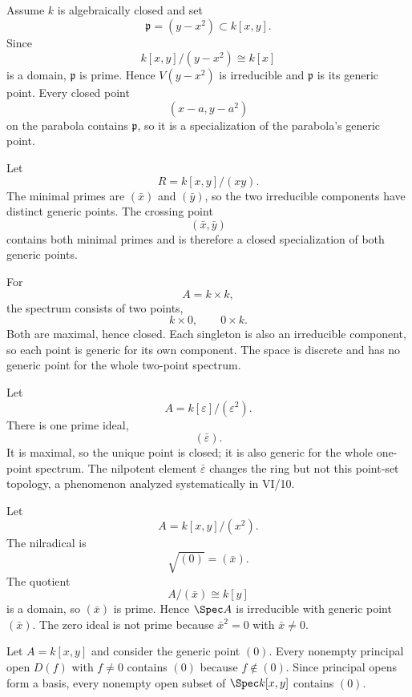 \begin{example}
Assume $k$ is algebraically closed and set
\[
\mathfrak p=(y-x^2)\subset k[x,y].
\]
Since
\[
k[x,y]/(y-x^2)\cong k[x]
\]
is a domain, $\mathfrak p$ is prime.  Hence $V(y-x^2)$ is irreducible and
$\mathfrak p$ is its generic point.  Every closed point
\[
(x-a,y-a^2)
\]
on the parabola contains $\mathfrak p$, so it is a specialization of the parabola's
generic point.
\end{example}

\begin{example}
Let
\[
R=k[x,y]/(xy).
\]
The minimal primes are $(\bar x)$ and $(\bar y)$, so the two irreducible components have
distinct generic points.  The crossing point
\[
(\bar x,\bar y)
\]
contains both minimal primes and is therefore a closed specialization of both generic
points.
\end{example}

\begin{example}
For
\[
A=k\times k,
\]
the spectrum consists of two points,
\[
k\times0,\qquad 0\times k.
\]
Both are maximal, hence closed.  Each singleton is also an irreducible component, so each
point is generic for its own component.  The space is discrete and has no generic point
for the whole two-point spectrum.
\end{example}

\begin{example}
Let
\[
A=k[\varepsilon]/(\varepsilon^2).
\]
There is one prime ideal,
\[
(\bar\varepsilon).
\]
It is maximal, so the unique point is closed; it is also generic for the whole one-point
spectrum.  The nilpotent element $\bar\varepsilon$ changes the ring but not this point-set
topology, a phenomenon analyzed systematically in VI/10.
\end{example}

\begin{example}
Let
\[
A=k[x,y]/(x^2).
\]
The nilradical is
\[
\sqrt{(0)}=(\bar x).
\]
The quotient
\[
A/(\bar x)\cong k[y]
\]
is a domain, so $(\bar x)$ is prime.  Hence $\Spec A$ is irreducible with generic point
$(\bar x)$.  The zero ideal is not prime because $\bar x^2=0$ with $\bar x\neq0$.
\end{example}

\begin{example}
Let $A=k[x,y]$ and consider the generic point $(0)$.  Every nonempty principal open
$D(f)$ with $f\neq0$ contains $(0)$ because $f\notin(0)$.  Since principal opens form a
basis, every nonempty open subset of $\Spec k[x,y]$ contains $(0)$.
\end{example}

